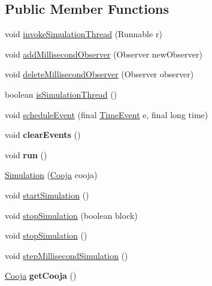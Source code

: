 \subsection*{Public Member Functions}
\begin{DoxyCompactItemize}
\item 
void \hyperlink{classorg_1_1contikios_1_1cooja_1_1Simulation_a0ef6f9dc924435b2eb386eb41950e803}{invoke\-Simulation\-Thread} (Runnable r)
\item 
void \hyperlink{classorg_1_1contikios_1_1cooja_1_1Simulation_a6c30336b3a1c4a2b4e17740537b0b830}{add\-Millisecond\-Observer} (Observer new\-Observer)
\item 
void \hyperlink{classorg_1_1contikios_1_1cooja_1_1Simulation_ab7e865094b023aa61fd427546d629aaa}{delete\-Millisecond\-Observer} (Observer observer)
\item 
boolean \hyperlink{classorg_1_1contikios_1_1cooja_1_1Simulation_a5b630fa3e827d876253cb8e8a3088577}{is\-Simulation\-Thread} ()
\item 
void \hyperlink{classorg_1_1contikios_1_1cooja_1_1Simulation_aba5d14753bd2be3fee0d1482fa1ec026}{schedule\-Event} (final \hyperlink{classorg_1_1contikios_1_1cooja_1_1TimeEvent}{Time\-Event} e, final long time)
\item 
\hypertarget{classorg_1_1contikios_1_1cooja_1_1Simulation_af1b7e348a4c69853a36d1b5271eb8b33}{void {\bfseries clear\-Events} ()}\label{classorg_1_1contikios_1_1cooja_1_1Simulation_af1b7e348a4c69853a36d1b5271eb8b33}

\item 
\hypertarget{classorg_1_1contikios_1_1cooja_1_1Simulation_a0b5be193cd0ff9afa7d0182d1402a86b}{void {\bfseries run} ()}\label{classorg_1_1contikios_1_1cooja_1_1Simulation_a0b5be193cd0ff9afa7d0182d1402a86b}

\item 
\hyperlink{classorg_1_1contikios_1_1cooja_1_1Simulation_a253e0212b6649aae4f15df59eac7082f}{Simulation} (\hyperlink{classorg_1_1contikios_1_1cooja_1_1Cooja}{Cooja} cooja)
\item 
void \hyperlink{classorg_1_1contikios_1_1cooja_1_1Simulation_a44a42bae3833b6e0ab14e386e29026e5}{start\-Simulation} ()
\item 
void \hyperlink{classorg_1_1contikios_1_1cooja_1_1Simulation_a81464528eba1e21ced1a88a39a9cf563}{stop\-Simulation} (boolean block)
\item 
void \hyperlink{classorg_1_1contikios_1_1cooja_1_1Simulation_aea5fa196be49ff54e8f9447aad24bde7}{stop\-Simulation} ()
\item 
void \hyperlink{classorg_1_1contikios_1_1cooja_1_1Simulation_a4d9db7c94ac1112e4f1b6b99c9a27154}{step\-Millisecond\-Simulation} ()
\item 
\hypertarget{classorg_1_1contikios_1_1cooja_1_1Simulation_adab9e988940ced2e52a9e0014a2aa2af}{\hyperlink{classorg_1_1contikios_1_1cooja_1_1Cooja}{Cooja} {\bfseries get\-Cooja} ()}\label{classorg_1_1contikios_1_1cooja_1_1Simulation_adab9e988940ced2e52a9e0014a2aa2af}


\end{DoxyCompactItemize}
